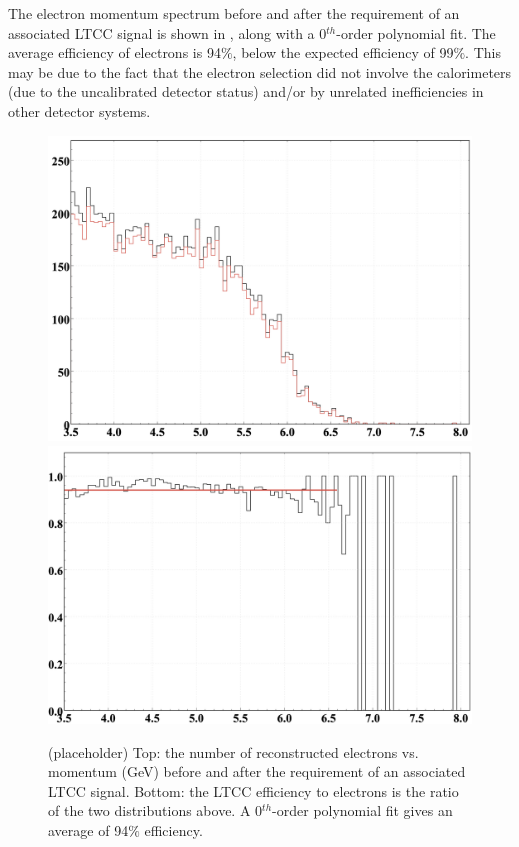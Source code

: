The electron momentum spectrum before and after the requirement of an associated LTCC signal is shown
in , along with a 0$^{th}$-order polynomial fit. The average efficiency of electrons is
94$\%$, below the expected efficiency of 99$\%$. This may be due to the fact that the electron selection
did not involve the calorimeters (due to the uncalibrated detector status) and/or by unrelated inefficiencies
in other detector systems.

\begin{figure}
	\centering
	\includegraphics[width=0.98\columnwidth,keepaspectratio]{img/electronMomenta.png}
	\includegraphics[width=0.98\columnwidth,keepaspectratio]{img/electronEfficiency.png}
	\caption{(placeholder) Top: the number of reconstructed electrons vs. momentum (GeV) before and
          after the requirement of an associated LTCC signal. Bottom: the LTCC efficiency to electrons is the
          ratio of the two distributions above. A 0$^{th}$-order polynomial fit gives an average of 94$\%$
          efficiency.}
	\label{fig:electronEfficiency}
\end{figure}

